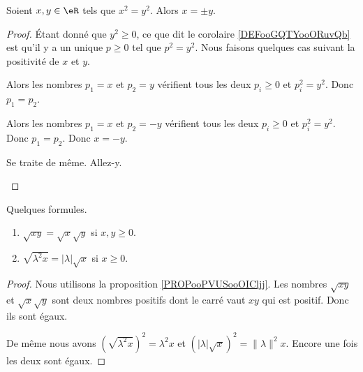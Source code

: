 \begin{proposition}	\label{PROPooPVUSooOICljj}
	Soient \( x,y\in \eR\) tels que \( x^2=y^2\). Alors \( x=\pm y\).
\end{proposition}

\begin{proof}
	Étant donné que \( y^2\geq0\), ce que dit le corolaire \ref{DEFooGQTYooORuvQb} est qu'il y a un unique \( p\geq 0\) tel que \( p^2=y^2\). Nous faisons quelques cas suivant la positivité de \( x\) et \( y\).
	\begin{subproof}
		\spitem[Si \( x,y\geq 0\)]
		Alors les nombres \( p_1=x\) et \( p_2=y\) vérifient tous les deux \( p_i\geq 0\) et \( p_i^2=y^2\). Donc \( p_1=p_2\).

		\spitem[Si \( x\geq 0\) et \( y<0\)]
		Alors les nombres \( p_1=x\) et \( p_2=-y\) vérifient tous les deux \( p_i\geq 0\) et \( p_i^2=y^2\). Donc \( p_1=p_2\). Donc \( x=-y\).

		\spitem[Si \( x< 0\) et \( y<0\)]
		Se traite de même.
		\spitem[Si \( x< 0\) et \( y\geq 0\)]
		Allez-y.
	\end{subproof}
\end{proof}

\begin{lemma}       \label{LEMooWSVNooKsymDy}
	Quelques formules.
	\begin{enumerate}
		\item
		      $\sqrt{ xy }=\sqrt{ x }\sqrt{ y }$ si \( x,y\geq 0\).
		\item       \label{ITEMooEPHBooCEeJOD}
		      \( \sqrt{ \lambda^2 x }=| \lambda |\sqrt{ x }\) si \( x\geq 0\).
	\end{enumerate}
\end{lemma}

\begin{proof}
	Nous utilisons la proposition \ref{PROPooPVUSooOICljj}. Les nombres \( \sqrt{xy}\) et \( \sqrt{x}\sqrt{ y }\) sont deux nombres positifs dont le carré vaut \( xy\) qui est positif. Donc ils sont égaux.

	De même nous avons \( (\sqrt{ \lambda^2 x})^2=\lambda^2 x\) et \( (| \lambda |\sqrt{ x })^2=\| \lambda \|^2x\). Encore une fois les deux sont égaux.
\end{proof}

